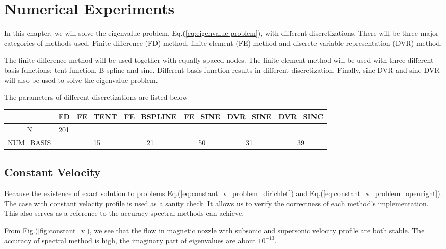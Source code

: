 \chapter{Numerical Experiments}
In this chapter, we will solve the eigenvalue problem, Eq.(\ref{eq:eigenvalue-problem}), with different discretizations. There will be three major categories of methods used. Finite difference (FD) method, finite element (FE) method and discrete variable representation (DVR) method.

The finite difference method will be used together with equally spaced nodes. The finite element method will be used with three different basis functions: tent function, B-spline and sine. Different basis function results in different discretization. Finally, sine DVR and sinc DVR will also be used to solve the eigenvalue problem.

The parameters of different discretizations are listed below
\begin{table} [H]
	\begin{tabular}{|c|c|c|c|c|c|c|}
		\hline
		& FD & FE\_TENT & FE\_BSPLINE & FE\_SINE & DVR\_SINE & DVR\_SINC \\
		\hline
		N & 201 &  &  &  &  &  \\
		\hline
		NUM\_BASIS &  & 15 & 21 & 50 & 31 & 39 \\
		\hline
	\end{tabular}
	\label{table:parameters}
\end{table}

\section{Constant Velocity}
Because the existence of exact solution to problems Eq.(\ref{eq:constant_v_problem_dirichlet}) and Eq.(\ref{eq:constant_v_problem_openright}). The case with constant velocity profile is used as a sanity check. It allows us to verify the correctness of each method's implementation. This also serves as a reference to the accuracy spectral methods can achieve.

From Fig.(\ref{fig:constant_v}), we see that the flow in magnetic nozzle with subsonic and supersonic velocity profile are both stable. The accuracy of spectral method is high, the imaginary part of eigenvalues are about $10^{-13}$.

